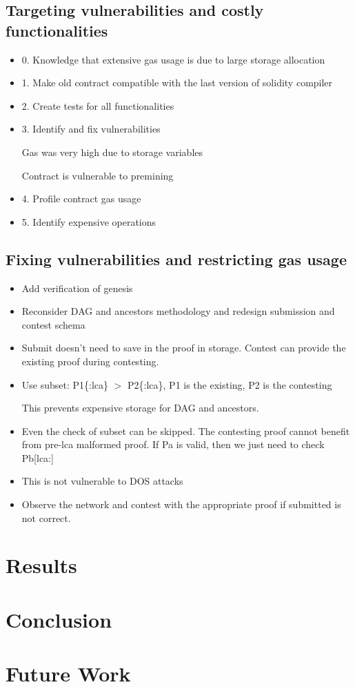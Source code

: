 \documentclass{article}
\begin{document}
  \subsection{Targeting vulnerabilities and costly functionalities}

  \begin{itemize}
  \item
    0. Knowledge that extensive gas usage is due to large storage
    allocation
  \item
    1. Make old contract compatible with the last version of solidity
    compiler
  \item
    2. Create tests for all functionalities
  \item
    3. Identify and fix vulnerabilities

    Gas was very high due to storage variables

    Contract is vulnerable to premining
  \item
    4. Profile contract gas usage
  \item
    5. Identify expensive operations
  \end{itemize}

  \subsection{Fixing vulnerabilities and restricting gas usage}

  \begin{itemize}

  \item
    Add verification of genesis
  \item
    Reconsider DAG and ancestors methodology and redesign submission and
    contest schema
  \item
    Submit doesn't need to save in the proof in storage. Contest can
    provide the existing proof during contesting.

  \item
    Use subset: P1\{:lca\} $>$ P2\{:lca\}, P1 is the existing, P2 is the
    contesting

    This prevents expensive storage for DAG and ancestors.

  \item
    Even the check of subset can be skipped. The contesting proof cannot
    benefit from pre-lca malformed proof. If Pa is valid, then we just
    need to check Pb[lca:]

  \item
    This is not vulnerable to DOS attacks

  \item
    Observe the network and contest with the appropriate proof if
    submitted is not correct.

  \end{itemize}

  \section{Results}

  \section{Conclusion}

  \section{Future Work}
\end{document}
